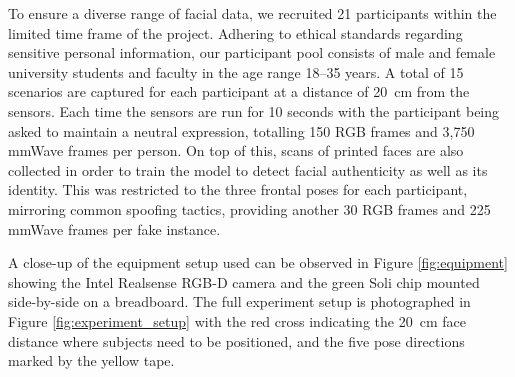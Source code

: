 \documentclass{mpaper}
\begin{document}

To ensure a diverse range of facial data, we recruited 21 participants within the limited time frame of the project. Adhering to ethical standards regarding sensitive personal information, our participant pool consists of male and female university students and faculty in the age range 18--35 years. A total of 15 scenarios are captured for each participant at a distance of \qty{20}{\cm} from the sensors. Each time the sensors are run for 10 seconds with the participant being asked to maintain a neutral expression, totalling 150 RGB frames and 3,750 mmWave frames per person. On top of this, scans of printed faces are also collected in order to train the model to detect facial authenticity as well as its identity. This was restricted to the three frontal poses for each participant, mirroring common spoofing tactics, providing another 30 RGB frames and 225 mmWave frames per fake instance.

A close-up of the equipment setup used can be observed in Figure \ref{fig:equipment} showing the Intel Realsense RGB-D camera and the green Soli chip mounted side-by-side on a breadboard. The full experiment setup is photographed in Figure \ref{fig:experiment_setup} with the red cross indicating the \qty{20}{\cm} face distance where subjects need to be positioned, and the five pose directions marked by the yellow tape.
\end{document}
